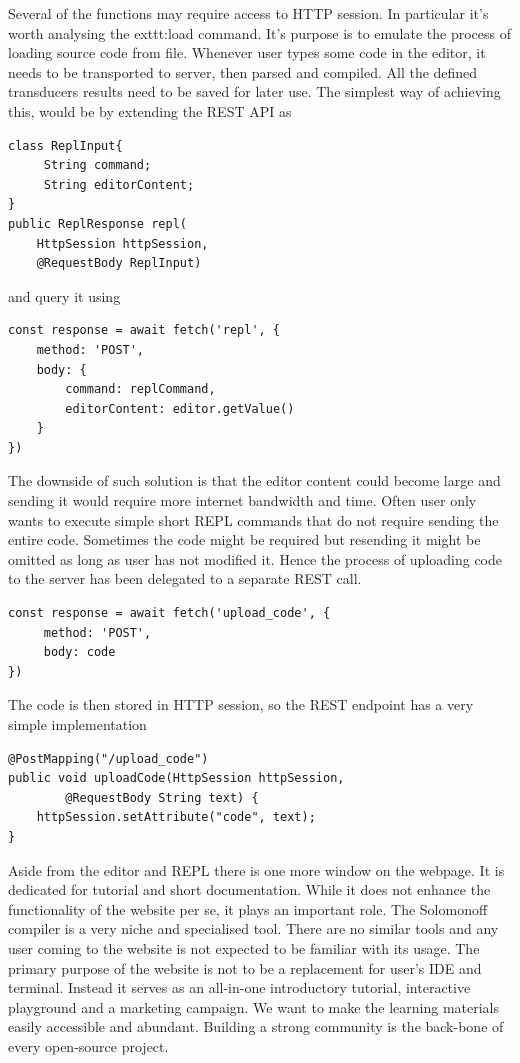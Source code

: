 Several of the functions may require access to HTTP session. In particular it's worth analysing the     exttt{:load} command. It's purpose is to emulate the process of loading source code from file. Whenever user types some code in the editor, it needs to be transported to server, then parsed and compiled. All the defined transducers results need to be saved for later use. The simplest way of achieving this, would be by extending the REST API as
\begin{lstlisting}
class ReplInput{
     String command;
     String editorContent;
}
public ReplResponse repl(
    HttpSession httpSession, 
    @RequestBody ReplInput)
\end{lstlisting}
and query it using
\begin{lstlisting}
const response = await fetch('repl', {
    method: 'POST',
    body: {
        command: replCommand,
        editorContent: editor.getValue()
    }
})
\end{lstlisting}
The downside of such solution is that the editor content could become large and sending it would require more internet bandwidth and time. Often user only wants to execute simple short REPL commands that do not require sending the entire code. Sometimes the code might be required but resending it might be omitted as long as user has not modified it. Hence the process of uploading code to the server has been delegated to a separate REST call.
\begin{lstlisting}
const response = await fetch('upload_code', {
     method: 'POST',
     body: code
})
\end{lstlisting}
The code is then stored in HTTP session, so the REST endpoint has a very simple implementation
\begin{lstlisting}
@PostMapping("/upload_code")
public void uploadCode(HttpSession httpSession, 
        @RequestBody String text) {
    httpSession.setAttribute("code", text);
}
\end{lstlisting}


Aside from the editor and REPL there is one more window on the webpage. It is dedicated for tutorial and short documentation.  While it does not enhance the functionality of the website per se, it plays an important role. The Solomonoff compiler is a very niche and specialised tool. There are no similar tools and any user coming to the website is not expected to be familiar with its usage. The primary purpose of the website is not to be a replacement for user's IDE and terminal. Instead it serves as an all-in-one introductory tutorial, interactive playground and a marketing campaign. We want to make the learning materials easily accessible and abundant. Building a strong community is the back-bone of every open-source project. 

